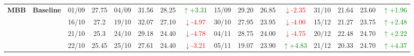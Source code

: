 {\begin{longtable}{llcc|cccc|cccc|cccc}
\multirow{4}{*}{\textbf{MBB}}
& \textbf{Baseline}
& 01/09 & 27.75 & 04/09 & 31.56 & 28.25 & \textcolor{green}{\(\uparrow\)+3.31} & 15/09 & 29.20 & 26.85 & \textcolor{red}{\(\downarrow\)-2.35} & 31/10 & 21.64 & 23.60 & \textcolor{green}{\(\uparrow\)+1.96} \\
& & 16/10 & 27.2 & 19/10 & 32.07 & 27.10 & \textcolor{red}{\(\downarrow\)-4.97} & 30/10 & 27.95 & 23.95 & \textcolor{red}{\(\downarrow\)-4.00} & 15/12 & 21.27 & 23.75 & \textcolor{green}{\(\uparrow\)+2.48} \\
& & 21/10 & 25.3 & 24/10 & 29.18 & 24.40 & \textcolor{red}{\(\downarrow\)-4.78} & 04/11 & 28.75 & 24.00 & \textcolor{red}{\(\downarrow\)-4.75} & 20/12 & 22.48 & 24.70 & \textcolor{green}{\(\uparrow\)+2.22} \\
& & 22/10 & 25.45 & 25/10 & 27.61 & 24.40 & \textcolor{red}{\(\downarrow\)-3.21} & 05/11 & 19.07 & 23.90 & \textcolor{green}{\(\uparrow\)+4.83} & 21/12 & 20.33 & 24.70 & \textcolor{green}{\(\uparrow\)+4.37} \\
\midrule

\end{longtable}
}
